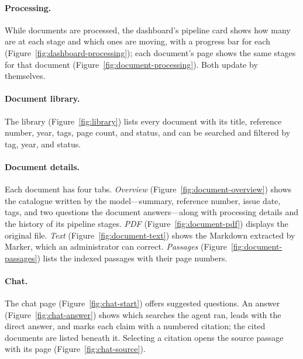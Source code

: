 
\paragraph{Processing.} While documents are processed, the dashboard's pipeline card shows how many are at each stage and which ones are moving, with a progress bar for each (Figure~\ref{fig:dashboard-processing}); each document's page shows the same stages for that document (Figure~\ref{fig:document-processing}). Both update by themselves.


\paragraph{Document library.} The library (Figure~\ref{fig:library}) lists every document with its title, reference number, year, tags, page count, and status, and can be searched and filtered by tag, year, and status.


\paragraph{Document details.} Each document has four tabs. \emph{Overview} (Figure~\ref{fig:document-overview}) shows the catalogue written by the model---summary, reference number, issue date, tags, and two questions the document answers---along with processing details and the history of its pipeline stages. \emph{PDF} (Figure~\ref{fig:document-pdf}) displays the original file. \emph{Text} (Figure~\ref{fig:document-text}) shows the Markdown extracted by Marker, which an administrator can correct. \emph{Passages} (Figure~\ref{fig:document-passages}) lists the indexed passages with their page numbers.


\paragraph{Chat.} The chat page (Figure~\ref{fig:chat-start}) offers suggested questions. An answer (Figure~\ref{fig:chat-answer}) shows which searches the agent ran, leads with the direct answer, and marks each claim with a numbered citation; the cited documents are listed beneath it. Selecting a citation opens the source passage with its page (Figure~\ref{fig:chat-source}).

